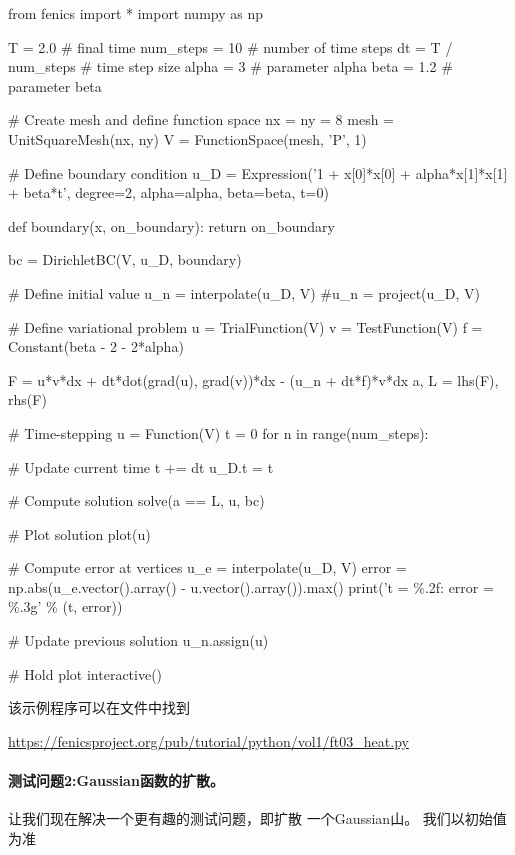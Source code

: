 \begin{python}
from fenics import *
import numpy as np

T = 2.0            # final time
num_steps = 10     # number of time steps
dt = T / num_steps # time step size
alpha = 3          # parameter alpha
beta = 1.2         # parameter beta

# Create mesh and define function space
nx = ny = 8
mesh = UnitSquareMesh(nx, ny)
V = FunctionSpace(mesh, 'P', 1)

# Define boundary condition
u_D = Expression('1 + x[0]*x[0] + alpha*x[1]*x[1] + beta*t',
                 degree=2, alpha=alpha, beta=beta, t=0)

def boundary(x, on_boundary):
    return on_boundary

bc = DirichletBC(V, u_D, boundary)

# Define initial value
u_n = interpolate(u_D, V)
#u_n = project(u_D, V)

# Define variational problem
u = TrialFunction(V)
v = TestFunction(V)
f = Constant(beta - 2 - 2*alpha)

F = u*v*dx + dt*dot(grad(u), grad(v))*dx - (u_n + dt*f)*v*dx
a, L = lhs(F), rhs(F)

# Time-stepping
u = Function(V)
t = 0
for n in range(num_steps):

    # Update current time
    t += dt
    u_D.t = t

    # Compute solution
    solve(a == L, u, bc)

    # Plot solution
    plot(u)

    # Compute error at vertices
    u_e = interpolate(u_D, V)
    error = np.abs(u_e.vector().array() - u.vector().array()).max()
    print('t = \%.2f: error = \%.3g' \% (t, error))

    # Update previous solution
    u_n.assign(u)

# Hold plot
interactive()
\end{python}
该示例程序可以在文件中找到
\begin{center}
  \url{https://fenicsproject.org/pub/tutorial/python/vol1/ft03_heat.py}
\end{center}


\paragraph{测试问题2:Gaussian函数的扩散。}
让我们现在解决一个更有趣的测试问题，即扩散
一个Gaussian山。 我们以初始值为准

